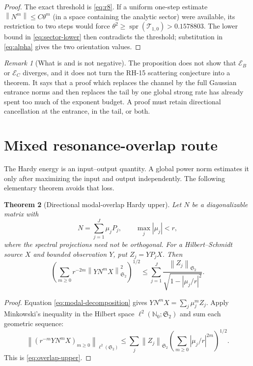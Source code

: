 \documentclass[11pt]{article}
\newtheorem{theorem}{Theorem}[section]
\theoremstyle{remark}
\newtheorem{remark}[theorem]{Remark}
\newcommand{\norm}[1]{\left\lVert#1\right\rVert}
\newcommand{\HS}{\mathfrak S_2}
\newcommand{\cE}{\mathcal E}
\newcommand{\spr}{\operatorname{spr}}
\begin{document}
\begin{proof}
The exact threshold is \eqref{eq:r8}.  If a uniform one-step estimate
$\norm{N^{m}}\le C\theta^m$ (in a space containing the analytic sector) were
available, its restriction to two steps would force
$\theta^2\ge\spr(\mathcal T_{1,0})>0.1578803$.  The lower bound in
\eqref{eq:sector-lower} then contradicts the threshold; substitution in
\eqref{eq:alpha} gives the two orientation values.
\end{proof}

\begin{remark}[What is and is not negative]
The proposition does not show that $\cE_B$ or $\cE_C$ diverges, and it does
not turn the RH-15 scattering conjecture into a theorem.  It says that a
proof which replaces the channel by the full Gaussian entrance norms and
then replaces the tail by one global strong rate has already spent too much
of the exponent budget.  A proof must retain directional cancellation at
the entrance, in the tail, or both.
\end{remark}

\section{Mixed resonance-overlap route}

The Hardy energy is an input--output quantity.  A global power norm estimates
it only after maximizing the input and output independently.  The following
elementary theorem avoids that loss.

\begin{theorem}[Directional modal-overlap Hardy upper]
\label{thm:overlap}
Let $N$ be a diagonalizable matrix with
\begin{equation}
 N=\sum_{j=1}^J\mu_jP_j,
 \qquad
 \max_j|\mu_j|<r,
 \label{eq:modal-decomposition}
\end{equation}
where the spectral projections need not be orthogonal.  For a
Hilbert--Schmidt source $X$ and bounded observation $Y$, put
$Z_j=YP_jX$.  Then
\begin{equation}
 \boxed{
 \left(\sum_{m\ge0}r^{-2m}\norm{YN^mX}_{\HS}^2\right)^{1/2}
 \le
 \sum_{j=1}^J
 \frac{\norm{Z_j}_{\HS}}
 {\sqrt{1-|\mu_j/r|^2}}.}
 \label{eq:overlap-upper}
\end{equation}
\end{theorem}

\begin{proof}
Equation \eqref{eq:modal-decomposition} gives
$YN^mX=\sum_j\mu_j^mZ_j$.  Apply Minkowski's inequality in the Hilbert space
$\ell^2(\mathbb N_0;\HS)$ and sum each geometric sequence:
\[
 \left\|(r^{-m}YN^mX)_{m\ge0}\right\|_{\ell^2(\HS)}
 \le\sum_j\norm{Z_j}_{\HS}
 \left(\sum_{m\ge0}|\mu_j/r|^{2m}\right)^{1/2}.
\]
This is \eqref{eq:overlap-upper}.
\end{proof}
\end{document}
